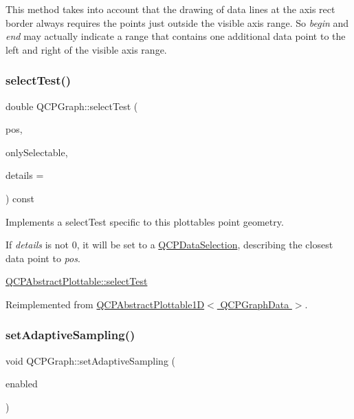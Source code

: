This method takes into account that the drawing of data lines at the axis rect border always requires the points just outside the visible axis range. So {\itshape begin} and {\itshape end} may actually indicate a range that contains one additional data point to the left and right of the visible axis range. \mbox{\label{classQCPGraph_a6d669d04462d272c6aa0e5f85846d673}} 
\subsubsection{\texorpdfstring{select\+Test()}{selectTest()}}
{\footnotesize\ttfamily double Q\+C\+P\+Graph\+::select\+Test (\begin{DoxyParamCaption}\item[{const Q\+PointF \&}]{pos,  }\item[{bool}]{only\+Selectable,  }\item[{Q\+Variant $\ast$}]{details = {} }\end{DoxyParamCaption}) const\hspace{0.3cm}{\ttfamily [virtual]}}

Implements a select\+Test specific to this plottable\textquotesingle{}s point geometry.

If {\itshape details} is not 0, it will be set to a \hyperlink{classQCPDataSelection}{Q\+C\+P\+Data\+Selection}, describing the closest data point to {\itshape pos}.

\hyperlink{classQCPAbstractPlottable_addb3f5c41f007a78c3e142cc605bc712}{Q\+C\+P\+Abstract\+Plottable\+::select\+Test} 

Reimplemented from \hyperlink{classQCPAbstractPlottable1D_a4611b43bcb6441b2154eb4f4e0a33db2}{Q\+C\+P\+Abstract\+Plottable1\+D$<$ Q\+C\+P\+Graph\+Data $>$}.

\mbox{\label{classQCPGraph_ab468cd600160f327836aa0644291e64c}} 
\subsubsection{\texorpdfstring{set\+Adaptive\+Sampling()}{setAdaptiveSampling()}}
{\footnotesize\ttfamily void Q\+C\+P\+Graph\+::set\+Adaptive\+Sampling (\begin{DoxyParamCaption}\item[{bool}]{enabled }\end{DoxyParamCaption})}

